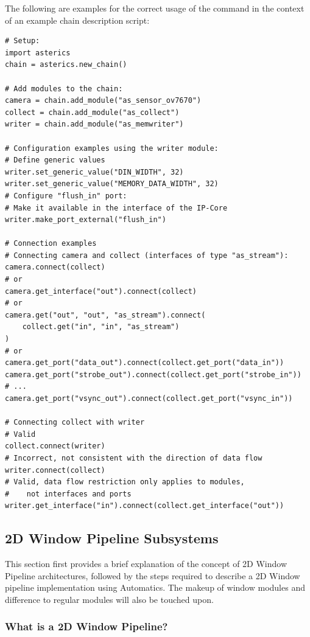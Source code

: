 The following are examples for the correct usage of the  command in the context of an example chain description script:
\begin{lstlisting}[style=AutomaticsPython]
# Setup:
import asterics
chain = asterics.new_chain()

# Add modules to the chain:
camera = chain.add_module("as_sensor_ov7670")
collect = chain.add_module("as_collect")
writer = chain.add_module("as_memwriter")

# Configuration examples using the writer module:
# Define generic values
writer.set_generic_value("DIN_WIDTH", 32)
writer.set_generic_value("MEMORY_DATA_WIDTH", 32)
# Configure "flush_in" port: 
# Make it available in the interface of the IP-Core
writer.make_port_external("flush_in")

# Connection examples
# Connecting camera and collect (interfaces of type "as_stream"):
camera.connect(collect)
# or
camera.get_interface("out").connect(collect)
# or
camera.get("out", "out", "as_stream").connect(
    collect.get("in", "in", "as_stream")
)
# or
camera.get_port("data_out").connect(collect.get_port("data_in"))
camera.get_port("strobe_out").connect(collect.get_port("strobe_in"))
# ...
camera.get_port("vsync_out").connect(collect.get_port("vsync_in"))

# Connecting collect with writer
# Valid
collect.connect(writer)
# Incorrect, not consistent with the direction of data flow
writer.connect(collect)
# Valid, data flow restriction only applies to modules,
#    not interfaces and ports
writer.get_interface("in").connect(collect.get_interface("out"))
\end{lstlisting}


\subsection{2D Window Pipeline Subsystems}
\label{ssec:02-2dwpl}

This section first provides a brief explanation of the concept of 2D Window Pipeline architectures,  followed by the steps required to describe a 2D Window pipeline implementation using Automatics.
The makeup of window modules and difference to regular \asterics modules will also be touched upon.

\subsubsection{What is a 2D Window Pipeline?}

